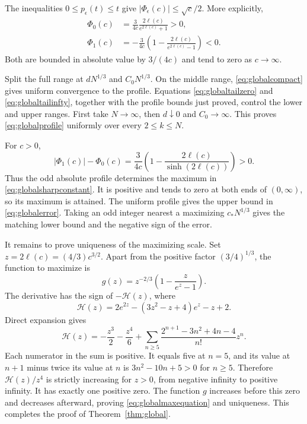 The inequalities $0\le p_\epsilon(t)\le t$ give
$|\Phi_\epsilon(c)|\le\sqrt c/2$. More explicitly,
\begin{align*}
\Phi_0(c)&=\frac3{4c}\frac{2\ell(c)}{e^{2\ell(c)}+1}>0,\\
\Phi_1(c)&=-\frac3{4c}
\left(1-\frac{2\ell(c)}{e^{2\ell(c)}-1}\right)<0.
\end{align*}
Both are bounded in absolute value by $3/(4c)$ and tend to zero as $c\to\infty$.

Split the full range at $dN^{1/3}$ and $C_0N^{1/3}$. On the middle range, \eqref{eq:globalcompact} gives uniform convergence to the profile. Equations \eqref{eq:globaltailzero} and \eqref{eq:globaltailinfty}, together with the profile bounds just proved, control the lower and upper ranges. First take $N\to\infty$, then $d\downarrow0$ and $C_0\to\infty$. This proves \eqref{eq:globalprofile} uniformly over every $2\le k\le N$.

For $c>0$,
\[
|\Phi_1(c)|-\Phi_0(c)
=\frac3{4c}\left(1-\frac{2\ell(c)}{\sinh(2\ell(c))}\right)>0.
\]
Thus the odd absolute profile determines the maximum in \eqref{eq:globalsharpconstant}. It is positive and tends to zero at both ends of $(0,\infty)$, so its maximum is attained. The uniform profile gives the upper bound in \eqref{eq:globalerror}. Taking an odd integer nearest a maximizing $c_*N^{1/3}$ gives the matching lower bound and the negative sign of the error.

It remains to prove uniqueness of the maximizing scale. Set $z=2\ell(c)=(4/3)c^{3/2}$. Apart from the positive factor $(3/4)^{1/3}$, the function to maximize is
\[
g(z)=z^{-2/3}\left(1-\frac z{e^z-1}\right).
\]
The derivative has the sign of $-\mathcal H(z)$, where
\[
\mathcal H(z)=2e^{2z}-(3z^2-z+4)e^z-z+2.
\]
Direct expansion gives
\[
\mathcal H(z)=-\frac{z^3}2-\frac{z^4}6
+\sum_{n\ge5}\frac{2^{n+1}-3n^2+4n-4}{n!}z^n.
\]
Each numerator in the sum is positive. It equals five at $n=5$, and its value at $n+1$ minus twice its value at $n$ is $3n^2-10n+5>0$ for $n\ge5$. Therefore $\mathcal H(z)/z^4$ is strictly increasing for $z>0$, from negative infinity to positive infinity. It has exactly one positive zero. The function $g$ increases before this zero and decreases afterward, proving \eqref{eq:globalmaxequation} and uniqueness. This completes the proof of Theorem~\ref{thm:global}.
